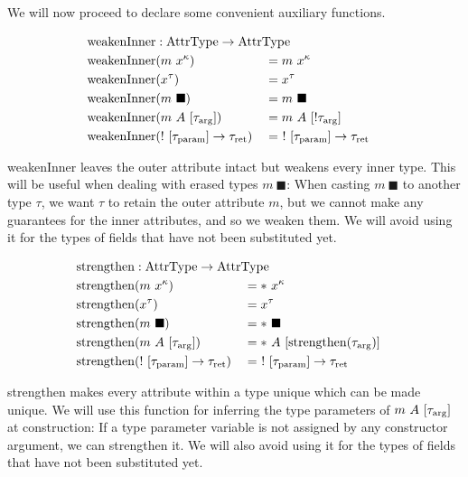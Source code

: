 We will now proceed to declare some convenient auxiliary functions. 

\newcommand{\weakenInner}{\mathrm{weakenInner}}

\begin{alignat*}{3}
	\weakenInner &: \mathrlap{\AttrType \to \AttrType} \\
	\weakenInner&(m\ x^\kappa) &&= m\ x^\kappa \\
	\weakenInner&(x^\tau) &&= x^\tau \\
	\weakenInner&(m\ \blacksquare) &&= m\ \blacksquare \\
	\weakenInner&(m\ A\ [\tau_\arrg]) &&= m\ A\ [!\tau_\arrg] \\
	\weakenInner&(!\ [\tau_\param] \to \tau_\ret) &&=\ !\ [\tau_\param] \to \tau_\ret \\
\end{alignat*}

weakenInner leaves the outer attribute intact but weakens every inner type. This will be useful when dealing with erased types $m\ \blacksquare$: When casting $m\ \blacksquare$ to another type $\tau$, we want $\tau$ to retain the outer attribute $m$, but we cannot make any guarantees for the inner attributes, and so we weaken them. We will avoid using it for the types of fields that have not been substituted yet.

\newcommand{\strengthen}{\mathrm{strengthen}}

\begin{alignat*}{3}
  \strengthen &: \mathrlap{\AttrType \to \AttrType} \\
  \strengthen&(m\ x^\kappa) &&= *\ x^\kappa \\
  \strengthen&(x^\tau) &&= x^\tau \\
  \strengthen&(m\ \blacksquare) &&= *\ \blacksquare \\
  \strengthen&(m\ A\ [\tau_\arrg]) &&= *\ A\ [\strengthen(\tau_\arrg)] \\
  \strengthen&(!\ [\tau_\param] \to \tau_\ret) &&=\ !\ [\tau_\param] \to \tau_\ret \\
\end{alignat*}

strengthen makes every attribute within a type unique which can be made unique. We will use this function for inferring the type parameters of $m\ A\ [\tau_{\mathrm{arg}}]$ at construction: If a type parameter variable is not assigned by any constructor argument, we can strengthen it. We will also avoid using it for the types of fields that have not been substituted yet.

